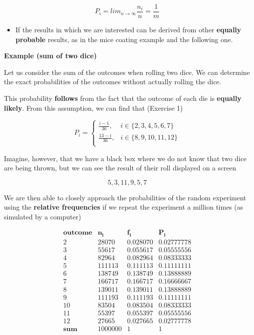 \documentclass[
]{book}
\providecommand{\tightlist}{%
  \setlength{\itemsep}{0pt}\setlength{\parskip}{0pt}}
\begin{document}
\[P_i=lim_{n\rightarrow \infty} \frac{n_i}{n}=\frac{1}{m}\]

\begin{itemize}
\tightlist
\item
  If the results in which we are interested can be derived from other \textbf{equally probable} results, as in the mice coating example and the following one.
\end{itemize}

\textbf{Example (sum of two dice)}

Let us consider the sum of the outcomes when rolling two dice. We can determine the exact probabilities of the outcomes without actually rolling the dice.

This probability \textbf{follows} from the fact that the outcome of each die is \textbf{equally likely}. From this assumption, we can find that (Exercise 1)

\[
    P_i =
\begin{cases}
\frac{i-1}{36},& i \in \{2,3,4,5,6, 7\} \\
\frac{13-i}{36},& i \in \{8,9,10,11,12\} \\
\end{cases}
\]

Imagine, however, that we have a black box where we do not know that two dice are being thrown, but we can see the result of their roll displayed on a screen

\[5, 3, 11, 9, 5, 7\]

We are then able to closely approach the probabilities of the random experiment using the \textbf{relative frequencies} if we repeat the experiment a million times (as simulated by a computer)

\[
\begin{array}{cccc}
\mathbf{outcome}   & \mathbf{n_i} & \mathbf{f_i} & \mathbf{P_i} \\
2  & 28070  & 0.028070  & 0.02777778 \\
3  & 55617  & 0.055617  & 0.05555556 \\
4  & 82964  & 0.082964  & 0.08333333 \\
5  & 111113 & 0.111113  & 0.11111111 \\
6  & 138749 & 0.138749  & 0.13888889 \\
7  & 166717 & 0.166717  & 0.16666667 \\
8  & 139011 & 0.139011  & 0.13888889 \\
9  & 111193 & 0.111193  & 0.11111111 \\
10 & 83504  & 0.083504  & 0.08333333 \\
11 & 55397  & 0.055397  & 0.05555556 \\
12 & 27665  & 0.027665  & 0.02777778 \\ \hline
\mathbf{sum} & 1000000 & 1 & 1 \\ 
\end{array}
\]
\end{document}
